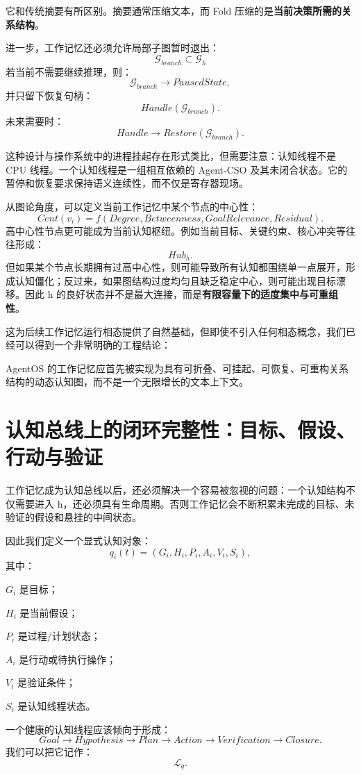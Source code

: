 它和传统摘要有所区别。摘要通常压缩文本，而 Fold 压缩的是\textbf{当前决策所需的关系结构}。

进一步，工作记忆还必须允许局部子图暂时退出：
\[
\mathcal G_{branch}
\subset
\mathcal G_h
\]
若当前不需要继续推理，则：
\[
\mathcal G_{branch}
\rightarrow
PausedState,
\]
并只留下恢复句柄：
\[
Handle(\mathcal G_{branch}).
\]
未来需要时：
\[
Handle
\rightarrow
Restore(\mathcal G_{branch}).
\]

这种设计与操作系统中的进程挂起存在形式类比，但需要注意：认知线程不是 CPU 线程。一个认知线程是一组相互依赖的 Agent-CSO 及其未闭合状态。它的暂停和恢复要求保持语义连续性，而不仅是寄存器现场。

从图论角度，可以定义当前工作记忆中某个节点的中心性：
\[
Cent(v_i)
=
f(
Degree,
Betweenness,
GoalRelevance,
Residual
).
\]
高中心性节点更可能成为当前认知枢纽。例如当前目标、关键约束、核心冲突等往往形成：
\[
Hub_h.
\]
但如果某个节点长期拥有过高中心性，则可能导致所有认知都围绕单一点展开，形成认知僵化；反过来，如果图结构过度均匀且缺乏稳定中心，则可能出现目标漂移。因此 h 的良好状态并不是最大连接，而是\textbf{有限容量下的适度集中与可重组性}。

这为后续工作记忆运行相态提供了自然基础，但即使不引入任何相态概念，我们已经可以得到一个非常明确的工程结论：
\begin{conclusion}
AgentOS 的工作记忆应首先被实现为具有可折叠、可挂起、可恢复、可重构关系结构的动态认知图，而不是一个无限增长的文本上下文。
\end{conclusion}

\section{认知总线上的闭环完整性：目标、假设、行动与验证}

工作记忆成为认知总线以后，还必须解决一个容易被忽视的问题：一个认知结构不仅需要进入 h，还必须具有生命周期。否则工作记忆会不断积累未完成的目标、未验证的假设和悬挂的中间状态。

因此我们定义一个显式认知对象：
\[
q_i(t)
=
\left(
G_i,
H_i,
P_i,
A_i,
V_i,
S_i
\right),
\]
其中：

$G_i$ 是目标；

$H_i$ 是当前假设；

$P_i$ 是过程/计划状态；

$A_i$ 是行动或待执行操作；

$V_i$ 是验证条件；

$S_i$ 是认知线程状态。

一个健康的认知线程应该倾向于形成：
\[
Goal
\rightarrow
Hypothesis
\rightarrow
Plan
\rightarrow
Action
\rightarrow
Verification
\rightarrow
Closure.
\]
我们可以把它记作：
\[
\mathcal L_q.
\]

